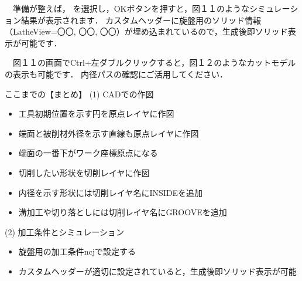 

\vspace*{1zh}
　準備が整えば， を選択し，OKボタンを押すと，図１１のようなシミュレーション結果が表示されます．
カスタムヘッダーに旋盤用のソリッド情報（LatheView=〇〇, 〇〇, 〇〇）が埋め込まれているので，生成後即ソリッド表示が可能です．


　図１１の画面でCtrl+左ダブルクリックすると，図１２のようなカットモデルの表示も可能です．
内径パスの確認にご活用してください．


\vspace*{3zh}
\begin{itembox}[l]{ここまでの【まとめ】}
(1) CADでの作図
\begin{itemize}
\item 工具初期位置を示す円を原点レイヤに作図
\item 端面と被削材外径を示す直線も原点レイヤに作図
\item 端面の一番下がワーク座標原点になる
\item 切削したい形状を切削レイヤに作図
\item 内径を示す形状には切削レイヤ名にINSIDEを追加
\item 溝加工や切り落としには切削レイヤ名にGROOVEを追加
\end{itemize}
(2) 加工条件とシミュレーション
\begin{itemize}
\item 旋盤用の加工条件ncjで設定する
\item カスタムヘッダーが適切に設定されていると，生成後即ソリッド表示が可能
\end{itemize}
\end{itembox}

